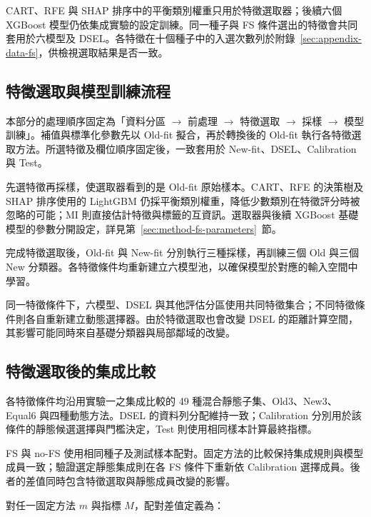 \endgroup

CART、RFE 與 SHAP 排序中的平衡類別權重只用於特徵選取器；後續六個 XGBoost 模型仍依集成實驗的設定訓練。同一種子與 FS 條件選出的特徵會共同套用於六模型及 DSEL。各特徵在十個種子中的入選次數列於附錄~\ref{sec:appendix-data-fs}，供檢視選取結果是否一致。


\subsection{特徵選取與模型訓練流程}

本部分的處理順序固定為「資料分區 \ensuremath{\rightarrow} 前處理 \ensuremath{\rightarrow} 特徵選取 \ensuremath{\rightarrow} 採樣 \ensuremath{\rightarrow} 模型訓練」。補值與標準化參數先以 Old-fit 擬合，再於轉換後的 Old-fit 執行各特徵選取方法。所選特徵及欄位順序固定後，一致套用於 New-fit、DSEL、Calibration 與 Test。

先選特徵再採樣，使選取器看到的是 Old-fit 原始樣本。CART、RFE 的決策樹及 SHAP 排序使用的 LightGBM 仍採平衡類別權重，降低少數類別在特徵評分時被忽略的可能；MI 則直接估計特徵與標籤的互資訊。選取器與後續 XGBoost 基礎模型的參數分開設定，詳見第~\ref{sec:method-fs-parameters}~節。

完成特徵選取後，Old-fit 與 New-fit 分別執行三種採樣，再訓練三個 Old 與三個 New 分類器。各特徵條件均重新建立六模型池，以確保模型於對應的輸入空間中學習。

同一特徵條件下，六模型、DSEL 與其他評估分區使用共同特徵集合；不同特徵條件則各自重新建立動態選擇器。由於特徵選取也會改變 DSEL 的距離計算空間，其影響可能同時來自基礎分類器與局部鄰域的改變。

\subsection{特徵選取後的集成比較}

各特徵條件均沿用實驗一之集成比較的 49 種混合靜態子集、Old3、New3、Equal6 與四種動態方法。DSEL 的資料列分配維持一致；Calibration 分別用於該條件的靜態候選選擇與門檻決定，Test 則使用相同樣本計算最終指標。

FS 與 no-FS 使用相同種子及測試樣本配對。固定方法的比較保持集成規則與模型成員一致；驗證選定靜態集成則在各 FS 條件下重新依 Calibration 選擇成員。後者的差值同時包含特徵選取與靜態成員改變的影響。

對任一固定方法 \(m\) 與指標 \(M\)，配對差值定義為：

